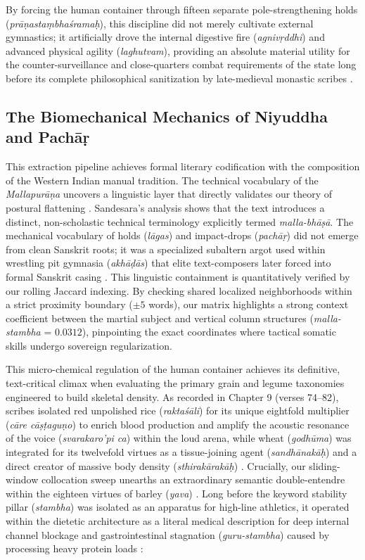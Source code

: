 \documentclass[11pt,twoside,letterpaper]{article}
\begin{document}
By forcing the human container through fifteen separate pole-strengthening holds (\textit{prāṇastaṃbhaśramaḥ}), this discipline did not merely cultivate external gymnastics; it artificially drove the internal digestive fire (\textit{agnivṛddhi}) and advanced physical agility (\textit{laghutvam}), providing an absolute material utility for the counter-surveillance and close-quarters combat requirements of the state long before its complete philosophical sanitization by late-medieval monastic scribes \citep{MP_7, Thomas2025}.


\subsection{The Biomechanical Mechanics of Niyuddha and Pachāṛ}
This extraction pipeline achieves formal literary codification with the composition of the Western Indian manual tradition. The technical vocabulary of the \textit{Mallapurāṇa} uncovers a linguistic layer that directly validates our theory of postural flattening \citep{MP_7}. Sandesara’s analysis shows that the text introduces a distinct, non-scholastic technical terminology explicitly termed \textit{malla-bhāṣā}. The mechanical vocabulary of holds (\textit{lāgas}) and impact-drops (\textit{pachāṛ}) did not emerge from clean Sanskrit roots; it was a specialized subaltern argot used within wrestling pit gymnasia (\textit{akhāḍās}) that elite text-composers later forced into formal Sanskrit casing \citep{Sandesara1948}. This linguistic containment is quantitatively verified by our rolling Jaccard indexing. By checking shared localized neighborhoods within a strict proximity boundary ($\pm 5$ words), our matrix highlights a strong context coefficient between the martial subject and vertical column structures (\textit{malla-stambha} = $0.0312$), pinpointing the exact coordinates where tactical somatic skills undergo sovereign regularization.

This micro-chemical regulation of the human container achieves its definitive, text-critical climax when evaluating the primary grain and legume taxonomies engineered to build skeletal density. As recorded in Chapter 9 (verses 74--82), scribes isolated red unpolished rice (\textit{raktaśāli}) for its unique eightfold multiplier (\textit{cāre cāṣṭaguṇo}) to enrich blood production and amplify the acoustic resonance of the voice (\textit{svarakaro'pi ca}) within the loud arena, while wheat (\textit{godhūma}) was integrated for its twelvefold virtues as a tissue-joining agent (\textit{sandhānakāḥ}) and a direct creator of massive body density (\textit{sthirakārakāḥ}) \citep{MP_7}. Crucially, our sliding-window collocation sweep unearths an extraordinary semantic double-entendre within the eighteen virtues of barley (\textit{yava}) \citep{MP_7}. Long before the keyword stability pillar (\textit{stambha}) was isolated as an apparatus for high-line athletics, it operated within the dietetic architecture as a literal medical description for deep internal channel blockage and gastrointestinal stagnation (\textit{guru-stambha}) caused by processing heavy protein loads \citep{MP_7}:
\end{document}
